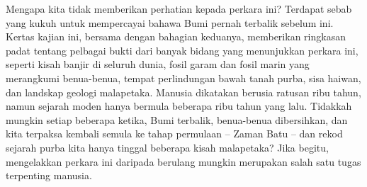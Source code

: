 \documentclass[10pt,twocolumn,letterpaper]{article}
\begin{document}
Mengapa kita tidak memberikan perhatian kepada perkara ini? Terdapat sebab yang kukuh untuk mempercayai bahawa Bumi pernah terbalik sebelum ini. Kertas kajian ini, bersama dengan bahagian keduanya, memberikan ringkasan padat tentang pelbagai bukti dari banyak bidang yang menunjukkan perkara ini, seperti kisah banjir di seluruh dunia, fosil garam dan fosil marin yang merangkumi benua-benua, tempat perlindungan bawah tanah purba, sisa haiwan, dan landskap geologi malapetaka. Manusia dikatakan berusia ratusan ribu tahun, namun sejarah moden hanya bermula beberapa ribu tahun yang lalu. Tidakkah mungkin setiap beberapa ketika, Bumi terbalik, benua-benua dibersihkan, dan kita terpaksa kembali semula ke tahap permulaan – Zaman Batu – dan rekod sejarah purba kita hanya tinggal beberapa kisah malapetaka? Jika begitu, mengelakkan perkara ini daripada berulang mungkin merupakan salah satu tugas terpenting manusia.
\end{document}
